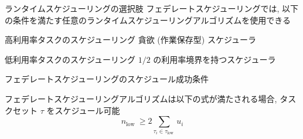 \begin{frame}{ランタイムスケジューリングの選択肢}
    フェデレートスケジューリングでは, 以下の条件を満たす任意のランタイムスケジューリングアルゴリズムを使用できる
    \begin{block}{高利用率タスクのスケジューリング}
        貪欲 (作業保存型) スケジューラ
    \end{block}
    \begin{block}{低利用率タスクのスケジューリング}
        $1 / 2$ の利用率境界を持つスケジューラ
    \end{block}
\end{frame}

\begin{frame}[label=theorem1]{フェデレートスケジューリングのスケジュール成功条件}
    \begin{theorem}[]
        フェデレートスケジューリングアルゴリズムは以下の式が満たされる場合, タスクセット $\tau$ をスケジュール可能
        \[
            n_{\text {low }} \geq 2 \sum_{\tau_{i} \in \tau_{\text {low }}} u_{i}
        \]
    \end{theorem}
\end{frame}
